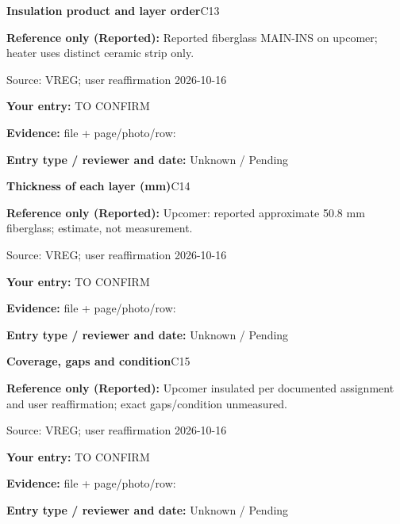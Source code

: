 \documentclass[11pt]{article}
\begin{document}
\par\noindent\begin{minipage}{\textwidth}\small
{\color{navy}\bfseries Insulation product and layer order}\hfill C13\par
\colorbox{pale}{\parbox{\dimexpr\linewidth-2\fboxsep\relax}{
\textbf{Reference only (Reported):} Reported fiberglass MAIN-INS on upcomer; heater uses distinct ceramic strip only.\par
{\footnotesize Source: VREG; user reaffirmation 2026-10-16}}}\par
\textbf{Your entry:} {\color{muted}TO CONFIRM}\enspace\hrulefill\par
{\footnotesize\textbf{Evidence:} file + page/photo/row: \hrulefill\par
\textbf{Entry type / reviewer and date:} Unknown / Pending\par
}\end{minipage}\par\vspace{5pt}
\par\noindent\begin{minipage}{\textwidth}\small
{\color{navy}\bfseries Thickness of each layer (mm)}\hfill C14\par
\colorbox{pale}{\parbox{\dimexpr\linewidth-2\fboxsep\relax}{
\textbf{Reference only (Reported):} Upcomer: reported approximate 50.8 mm fiberglass; estimate, not measurement.\par
{\footnotesize Source: VREG; user reaffirmation 2026-10-16}}}\par
\textbf{Your entry:} {\color{muted}TO CONFIRM}\enspace\hrulefill\par
{\footnotesize\textbf{Evidence:} file + page/photo/row: \hrulefill\par
\textbf{Entry type / reviewer and date:} Unknown / Pending\par
}\end{minipage}\par\vspace{5pt}
\par\noindent\begin{minipage}{\textwidth}\small
{\color{navy}\bfseries Coverage, gaps and condition}\hfill C15\par
\colorbox{pale}{\parbox{\dimexpr\linewidth-2\fboxsep\relax}{
\textbf{Reference only (Reported):} Upcomer insulated per documented assignment and user reaffirmation; exact gaps/condition unmeasured.\par
{\footnotesize Source: VREG; user reaffirmation 2026-10-16}}}\par
\textbf{Your entry:} {\color{muted}TO CONFIRM}\enspace\hrulefill\par
{\footnotesize\textbf{Evidence:} file + page/photo/row: \hrulefill\par
\textbf{Entry type / reviewer and date:} Unknown / Pending\par
}\end{minipage}\par\vspace{5pt}
\end{document}
